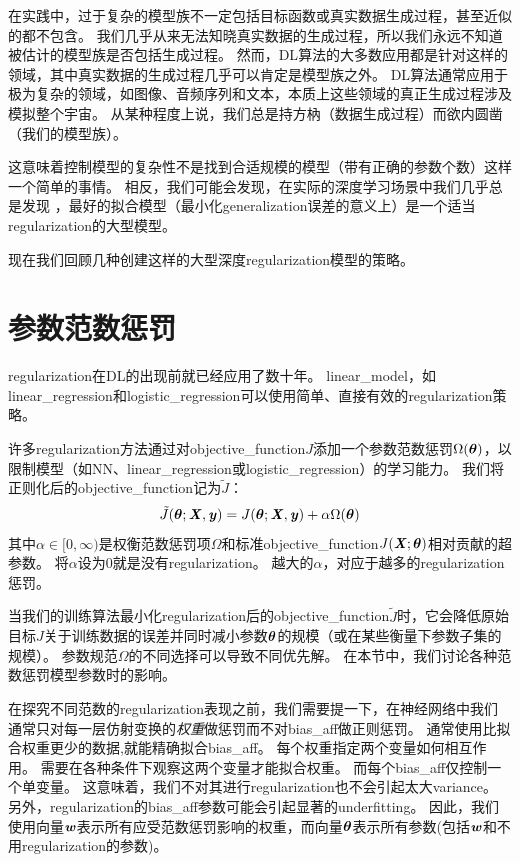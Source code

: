 在实践中，过于复杂的模型族不一定包括目标函数或真实数据生成过程，甚至近似的都不包含。
我们几乎从来无法知晓真实数据的生成过程，所以我们永远不知道被估计的模型族是否包括生成过程。
然而，\gls{DL}算法的大多数应用都是针对这样的领域，其中真实数据的生成过程几乎可以肯定是模型族之外。
\gls{DL}算法通常应用于极为复杂的领域，如图像、音频序列和文本，本质上这些领域的真正生成过程涉及模拟整个宇宙。
从某种程度上说，我们总是持方枘（数据生成过程）而欲内圆凿（我们的模型族）。

这意味着控制模型的复杂性不是找到合适规模的模型（带有正确的参数个数）这样一个简单的事情。
相反，我们可能会发现，在实际的深度学习场景中我们几乎总是发现
，最好的拟合模型（最小化\gls{generalization}误差的意义上）是一个适当\gls{regularization}的大型模型。

现在我们回顾几种创建这样的大型深度\gls{regularization}模型的策略。


\section{参数范数惩罚}
\label{sec:parameter_norm_penalties}
\gls{regularization}在\gls{DL}的出现前就已经应用了数十年。
\gls{linear_model}，如\gls{linear_regression}和\gls{logistic_regression}可以使用简单、直接有效的\gls{regularization}策略。

许多\gls{regularization}方法通过对\gls{objective_function}$J$添加一个参数范数惩罚$\Omega(\boldsymbol{\theta})$，以限制模型（如\gls{NN}、\gls{linear_regression}或\gls{logistic_regression}）的学习能力。
我们将正则化后的\gls{objective_function}记为$\tilde{J}$：
\begin{align}
 \tilde{J}(\boldsymbol{\theta};\boldsymbol{\mathit{X}}, \boldsymbol{\mathit{y}}) = J(\boldsymbol{\theta};\boldsymbol{\mathit{X}}, \boldsymbol{\mathit{y}}) + \alpha \Omega(\boldsymbol{\theta})
\end{align}
其中$\alpha \in [0, \infty)$是权衡范数惩罚项$\Omega$和标准\gls{objective_function}$J(\boldsymbol{\mathit{X}};\boldsymbol{\theta})$相对贡献的超参数。
将$\alpha$设为0就是没有\gls{regularization}。
越大的$\alpha$，对应于越多的\gls{regularization}惩罚。

当我们的训练算法最小化\gls{regularization}后的\gls{objective_function}$\tilde{J}$时，它会降低原始目标$J$关于训练数据的误差并同时减小参数$\boldsymbol{\theta}$的规模（或在某些衡量下参数子集的规模）。
参数规范$\Omega$的不同选择可以导致不同优先解。
在本节中，我们讨论各种范数惩罚模型参数时的影响。

在探究不同范数的\gls{regularization}表现之前，我们需要提一下，在神经网络中我们通常只对每一层仿射变换的\emph{权重}做惩罚而不对\gls{bias_aff}做正则惩罚。
通常使用比拟合权重更少的数据,就能精确拟合\gls{bias_aff}。
每个权重指定两个变量如何相互作用。
需要在各种条件下观察这两个变量才能拟合权重。
而每个\gls{bias_aff}仅控制一个单变量。
这意味着，我们不对其进行\gls{regularization}也不会引起太大\gls{variance}。
另外，\gls{regularization}的\gls{bias_aff}参数可能会引起显著的\gls{underfitting}。
因此，我们使用向量$\boldsymbol{\mathit{w}}$表示所有应受范数惩罚影响的权重，而向量$\boldsymbol{\theta}$表示所有参数(包括$\boldsymbol{\mathit{w}}$和不用\gls{regularization}的参数)。

